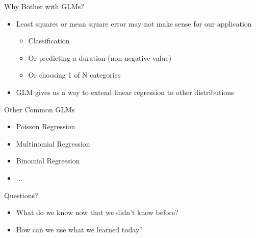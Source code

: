 \documentclass[aspectratio=169]{beamer}
\begin{document}
\begin{frame}{Why Bother with GLMs?}

\begin{itemize}
	\item Least squares or mean square error may not make sense for our application
	\begin{itemize}
	\item Classification
	\item Or predicting a duration (non-negative value)
	\item Or choosing 1 of N categories
	\end{itemize}
\item GLM gives us a way to extend linear regression to other distributions
\end{itemize}
\end{frame}
\begin{frame}{Other Common GLMs}

\begin{itemize}
\item Poisson Regression
\item Multinomial Regression
\item Binomial Regression
\item ...
\end{itemize}
\end{frame}
\begin{frame}{Questions?}
\begin{itemize}
	\item What do we know now that we didn't know before?
	\vspace{5 em}
	\item How can we use what we learned today?
\end{itemize}
\end{frame}
\end{document}
